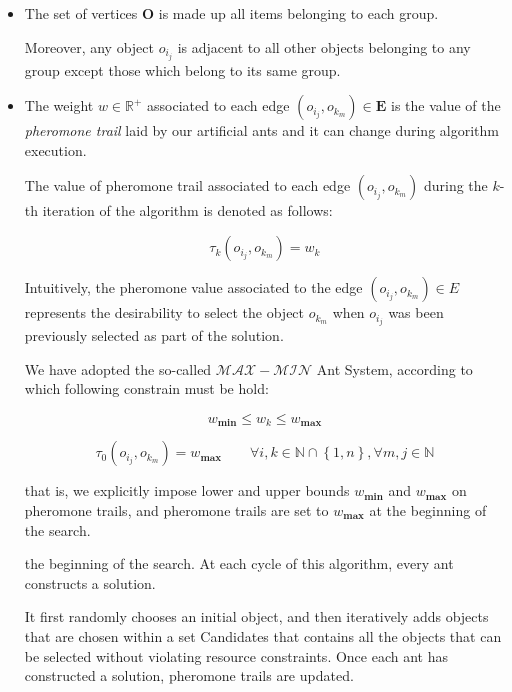 \documentclass[12pt,a4paper]{report}
\newcommand{\N}{\mathbb{N}}
\newcommand{\Rplus}{\mathbb{R}^+}
\theoremstyle{definition}
\begin{document}
\begin{itemize}
	
	\item The set of vertices $\textbf{O}$ is made up all items belonging to each group. 
	
	Moreover, any object $o_{i_j}$ is adjacent to all other objects belonging to any group except those which belong to its same group.
	
	\item The weight $w \in \Rplus$ associated to each edge $(o_{i_j}, o_{k_m}) \in \textbf{E}$ is the value of the \textit{pheromone trail} laid by our artificial ants and it can change during algorithm execution. 
	
	The value of pheromone trail associated to each edge $(o_{i_j}, o_{k_m})$ during the $k$-th iteration of the algorithm is denoted as follows:
	
	\begin{equation}
		\tau_k(o_{i_j}, o_{k_m}) = w_k
	\end{equation}
	
	Intuitively, the pheromone value associated to the edge $(o_{i_j}, o_{k_m}) \in E$ represents the desirability to select the object $o_{k_m}$ when $o_{i_j}$ was been previously selected as part of the solution.
	
	We have adopted the so-called $\mathcal{MAX} - \mathcal{MIN}$ Ant System, according to which following constrain must be hold:
	
	\begin{equation}
		w_{\textbf{min}} \leq w_k \leq w_{\textbf{max}} 
	\end{equation}

	\begin{equation}
		\tau_0(o_{i_j}, o_{k_m}) = w_{\textbf{max}} \qquad \forall i,k \in \N \cap \left\{1,n\right\}, \forall m,j \in \N 
	\end{equation}
	
	that is, we explicitly impose lower and upper bounds $w_{\textbf{min}}$ and $w_{\textbf{max}}$ on pheromone
	trails, and pheromone trails are set to $w_{\textbf{max}}$ at the beginning of the search.
	
	
	the beginning of the search.
	At each cycle of this algorithm, every ant constructs a solution. 
	
	It first randomly chooses an initial object, and then iteratively adds objects that are chosen within a set Candidates that contains all the objects that can be selected without violating resource constraints. Once each ant has constructed a solution, pheromone trails are updated. 
	
	
\end{itemize}
\end{document}
